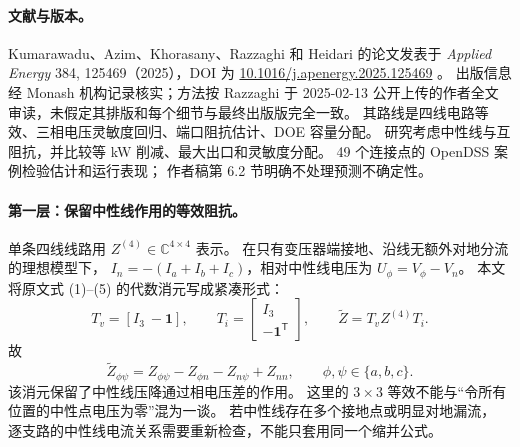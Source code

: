 \documentclass[UTF8,11pt,fontset=fandol]{ctexart}
\theoremstyle{remark}
\numberwithin{equation}{section}
\begin{document}
\paragraph{文献与版本。}
Kumarawadu、Azim、Khorasany、Razzaghi 和 Heidari 的论文发表于
\emph{Applied Energy} 384, 125469（2025），DOI 为
\href{https://doi.org/10.1016/j.apenergy.2025.125469}{10.1016/j.apenergy.2025.125469}
\citep{S10}。
出版信息经 Monash 机构记录核实；方法按 Razzaghi 于 2025-02-13
公开上传的作者全文审读，未假定其排版和每个细节与最终出版版完全一致。
其路线是四线电路等效、三相电压灵敏度回归、端口阻抗估计、DOE 容量分配。
研究考虑中性线与互阻抗，并比较等 kW 削减、最大出口和灵敏度分配。
49 个连接点的 OpenDSS 案例检验估计和运行表现；
作者稿第 6.2 节明确不处理预测不确定性。

\paragraph{第一层：保留中性线作用的等效阻抗。}
单条四线线路用 $Z^{(4)}\in\mathbb C^{4\times4}$ 表示。
在只有变压器端接地、沿线无额外对地分流的理想模型下，
$I_n=-(I_a+I_b+I_c)$，相对中性线电压为 $U_\phi=V_\phi-V_n$。
本文将原文式 (1)--(5) 的代数消元写成紧凑形式：
\begin{equation}
 T_v=[I_3\ -\mathbf1],\qquad
 T_i=\begin{bmatrix}I_3\\-\mathbf1^{\mathsf T}\end{bmatrix},\qquad
 \widetilde Z=T_vZ^{(4)}T_i.
 \label{eq:eng-s10-neutral}
\end{equation}
故
\begin{equation}
 \widetilde Z_{\phi\psi}
 =Z_{\phi\psi}-Z_{\phi n}-Z_{n\psi}+Z_{nn},
 \qquad \phi,\psi\in\{a,b,c\}.
 \label{eq:eng-s10-zentry}
\end{equation}
该消元保留了中性线压降通过相电压差的作用。
这里的 $3\times3$ 等效不能与“令所有位置的中性点电压为零”混为一谈。
若中性线存在多个接地点或明显对地漏流，
逐支路的中性线电流关系需要重新检查，不能只套用同一个缩并公式。
\end{document}
